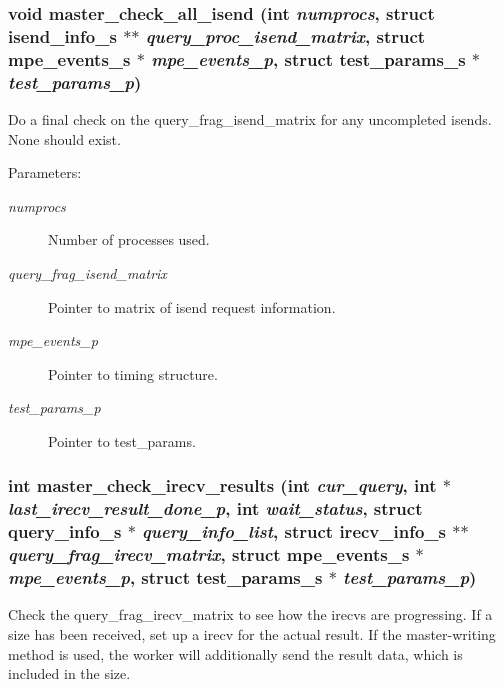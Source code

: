 \subsubsection{\setlength{\rightskip}{0pt plus 5cm}void master\_\-check\_\-all\_\-isend (int {\em numprocs}, struct \bf{isend\_\-info\_\-s} $\ast$$\ast$ {\em query\_\-proc\_\-isend\_\-matrix}, struct \bf{mpe\_\-events\_\-s} $\ast$ {\em mpe\_\-events\_\-p}, struct \bf{test\_\-params\_\-s} $\ast$ {\em test\_\-params\_\-p})}\label{master__help_8c_e9e4357779e91a90668aa50975e3effe}


Do a final check on the query\_\-frag\_\-isend\_\-matrix for any uncompleted isends. None should exist.

\begin{Desc}
\item[Parameters:]
\begin{description}
\item[{\em numprocs}]Number of processes used. \item[{\em query\_\-frag\_\-isend\_\-matrix}]Pointer to matrix of isend request information. \item[{\em mpe\_\-events\_\-p}]Pointer to timing structure. \item[{\em test\_\-params\_\-p}]Pointer to test\_\-params. \end{description}
\end{Desc}
\subsubsection{\setlength{\rightskip}{0pt plus 5cm}int master\_\-check\_\-irecv\_\-results (int {\em cur\_\-query}, int $\ast$ {\em last\_\-irecv\_\-result\_\-done\_\-p}, int {\em wait\_\-status}, struct \bf{query\_\-info\_\-s} $\ast$ {\em query\_\-info\_\-list}, struct \bf{irecv\_\-info\_\-s} $\ast$$\ast$ {\em query\_\-frag\_\-irecv\_\-matrix}, struct \bf{mpe\_\-events\_\-s} $\ast$ {\em mpe\_\-events\_\-p}, struct \bf{test\_\-params\_\-s} $\ast$ {\em test\_\-params\_\-p})}\label{master__help_8c_ea8d2bd2e0ac0e51fe229c9f49d96cf2}


Check the query\_\-frag\_\-irecv\_\-matrix to see how the irecvs are progressing. If a size has been received, set up a irecv for the actual result. If the master-writing method is used, the worker will additionally send the result data, which is included in the size.

